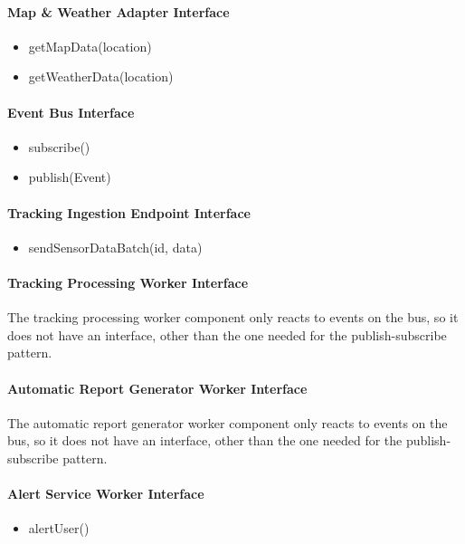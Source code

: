 \paragraph{Map \& Weather Adapter Interface}
\begin{itemize}
    \item getMapData(location)
    \item getWeatherData(location)
\end{itemize}

\paragraph{Event Bus Interface}
\begin{itemize}
    \item subscribe()
    \item publish(Event)
\end{itemize}

\paragraph{Tracking Ingestion Endpoint Interface}
\begin{itemize}
    \item sendSensorDataBatch(id, data)
\end{itemize}

\paragraph{Tracking Processing Worker Interface}
The tracking processing worker component only reacts to  events on the bus, so it does not have an interface, other than the one needed for the publish-subscribe pattern.

\paragraph{Automatic Report Generator Worker Interface}
The automatic report generator worker component only reacts to  events on the bus, so it does not have an interface, other than the one needed for the publish-subscribe pattern.

\paragraph{Alert Service Worker Interface}
\begin{itemize}
    \item alertUser()
\end{itemize}

